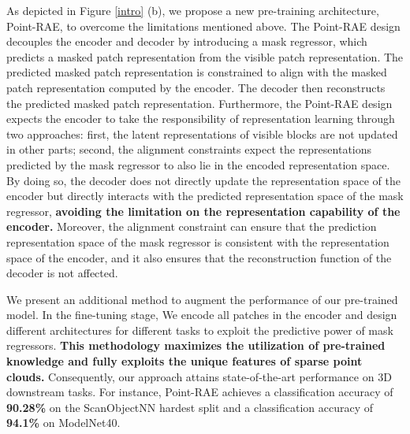 \documentclass[sigconf, screen]{acmart}
\begin{document}
As depicted in Figure \ref{intro} (b), we propose a new pre-training architecture, Point-RAE, to overcome the limitations mentioned above. The Point-RAE design decouples the encoder and decoder by introducing a mask regressor, which predicts a masked patch representation from the visible patch representation. The predicted masked patch representation is constrained to align with the masked patch representation computed by the encoder. The decoder then reconstructs the predicted masked patch representation. Furthermore, the Point-RAE design expects the encoder to take the responsibility of representation learning through two approaches: first, the latent representations of visible blocks are not updated in other parts; second, the alignment constraints expect the representations predicted by the mask regressor to also lie in the encoded representation space.
By doing so, the decoder does not directly update the representation space of the encoder but directly interacts with the predicted representation space of the mask regressor, \textbf{avoiding the limitation on the representation capability of the encoder.}
Moreover, the alignment constraint can ensure that the prediction representation space of the mask regressor is consistent with the representation space of the encoder, and it also ensures that the reconstruction function of the decoder is not affected.


We present an additional method to augment the performance of our pre-trained model. 
In the fine-tuning stage, We encode all patches in the encoder and design different architectures for different tasks to exploit the predictive power of mask regressors.
\textbf{This methodology maximizes the utilization of pre-trained knowledge and fully exploits the unique features of sparse point clouds.}
Consequently, our approach attains state-of-the-art performance on 3D downstream tasks. For instance, Point-RAE achieves a classification accuracy of \textbf{90.28\%} on the ScanObjectNN \cite{uy2019revisiting} hardest split and a classification accuracy of \textbf{94.1\%} on ModelNet40.
\end{document}
